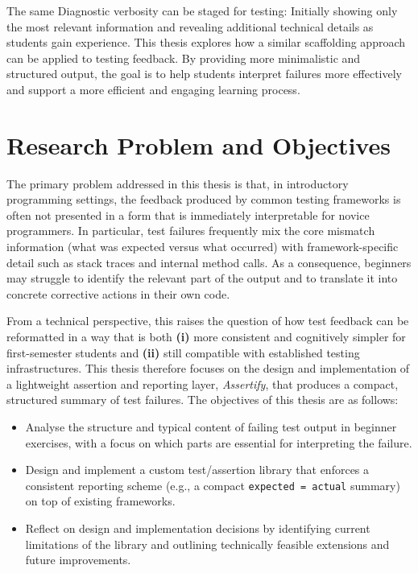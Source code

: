 \noindent The same  Diagnostic verbosity can be staged for testing: Initially showing only the most relevant information and revealing additional technical details as students gain experience.
This thesis explores how a similar scaffolding approach can be applied to testing feedback.
By providing more minimalistic and structured output, the goal is to help students interpret failures more effectively and support a more efficient and engaging learning process.


\section{Research Problem and Objectives} %
\label{sec:intro-research-problem}



The primary problem addressed in this thesis is that, in introductory programming settings,
the feedback produced by common testing frameworks is often not presented in a form that is immediately interpretable for novice programmers.
In particular, test failures frequently mix the core mismatch information (what was expected versus what occurred)
with framework-specific detail such as stack traces and internal method calls.
As a consequence, beginners may struggle to identify the relevant part of the output and to translate it into concrete corrective actions in their own code.

\noindent From a technical perspective, this raises the question of how test feedback can be reformatted in a way that is
both \textbf{(i)} more consistent and cognitively simpler for first-semester students and \textbf{(ii)} still compatible with established testing infrastructures.
This thesis therefore focuses on the design and implementation of a lightweight assertion and reporting layer, \emph{Assertify}, that produces a compact, structured summary of test failures.
The objectives of this thesis are as follows:
\begin{itemize}[nosep]
    \item Analyse the structure and typical content of failing test output in beginner exercises, with a focus on which parts are essential for interpreting the failure.
    \item Design and implement a custom test/assertion library that enforces a consistent reporting scheme (e.g., a compact \texttt{expected = actual} summary) on top of existing frameworks.
    \item Reflect on design and implementation decisions by identifying current limitations of the library and outlining technically feasible extensions and future improvements.
\end{itemize}

